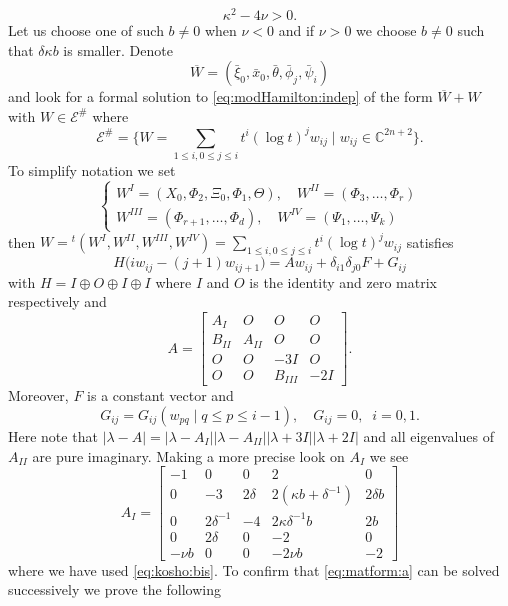\documentclass[12pt,leqno]{article} %
\def\C{{\mathbb C}}
\def\la{\lambda}
\def\C{\mathbb{C}}
\numberwithin{equation}{section}
\begin{document}
%
\[
\kappa^2-4\nu>0.
\]
% 
Let us choose one of such $b\neq 0$ when $\nu<0$ and if $\nu>0$ we choose $b\neq 0$ such that $\delta\kappa b$ is smaller. Denote 
%
\[
\overline{W}=(\bar\xi_0,\bar x_0,\bar\theta, \bar\phi_j,\bar\psi_i)
\]
%
and look for a formal solution to \eqref{eq:modHamilton:indep} of the form $\overline{W}+W$ with $W\in {\mathcal E}^{\#}$ where 
%
\[
{\mathcal E}^{\#}=\{W=\sum_{1\leq i,0\leq j\leq i}t^i(\log t)^jw_{ij}\mid w_{ij}\in \C^{2n+2}\}.
\]
%
 To simplify notation we set
%
\[
\left\{\begin{array}{ll}W^I=(X_0,\Phi_2,\Xi_0,\Phi_1,\Theta),\quad W^{II}=(\Phi_{3},\ldots,\Phi_r)\\
W^{III}=(\Phi_{r+1},\ldots,\Phi_d),\quad W^{IV}=(\Psi_1,\ldots,\Psi_k)
\end{array}\right.
\]
%
then $W={^t}(W^I, W^{II}, W^{III}, W^{IV})=\sum_{1\leq i,0\leq j\leq i}t^i(\log t)^jw_{ij}$ satisfies
%
\begin{equation}
\label{eq:matform:a}
H\big(iw_{ij}-(j+1)w_{ij+1}\big)=Aw_{ij}+\delta_{i1}\delta_{j0}F+G_{ij}
\end{equation}
%
with $H=I\oplus O\oplus I\oplus I$ where $I$ and $O$ is the identity and zero matrix respectively and
%
\begin{equation}
\label{eq:A:form}
A=\left[\begin{array}{cccc}A_I&O&O&O\\
B_{II}&A_{II}&O&O\\
O&O&-3I&O\\
O&O&B_{III}&-2I
\end{array}\right].
\end{equation}
%
Moreover, $F$ is a constant vector and  
%
\[
G_{ij}=G_{ij}(w_{pq}\mid q\leq p\leq i-1),\quad G_{ij}=0,\;\;i=0,1.
\]
%
%
Here note that $|\la-A|=|\la-A_I||\la-A_{II}||\la+3I||\la+2I|$ and all eigenvalues of $A_{II}$ are pure imaginary. Making a more precise look on
$A_I$ we see 
%
\begin{equation}
\label{eq:A:I}
A_I=\left[\begin{array}{ccccc}
-1&0&0&2&0\\
0&-3&2\delta&2(\kappa b+\delta^{-1})&2\delta b\\
0&2\delta^{-1}&-4&2\kappa\delta^{-1}b&2b\\
0&2\delta&0&-2&0\\
-\nu b&0&0&-2\nu b&-2
\end{array}\right]
\end{equation}
%
where we have used \eqref{eq:kosho:bis}. To confirm that \eqref{eq:matform:a} can be solved successively we prove the following
\end{document}
